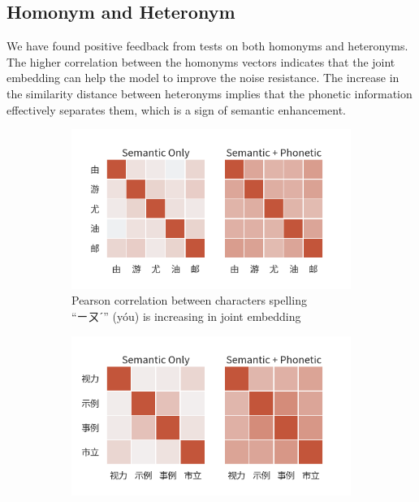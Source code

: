 \subsection{Homonym and Heteronym} \label{sec:analysis_homonym_heteronym}

We have found positive feedback from tests on both homonyms and heteronyms. The higher correlation between the homonyms vectors indicates that the joint embedding can help the model to improve the noise resistance. The increase in the similarity distance between heteronyms implies that the phonetic information effectively separates them, which is a sign of semantic enhancement.

\begin{figure}[t]
    \centering
    \begin{subfigure}[b]{0.49\textwidth}
        \centering
        \includegraphics[width=\textwidth]{../images/corr_zh1.png}
        \caption{Pearson correlation between characters spelling \\``ㄧㄡˊ'' (yóu) is increasing in joint embedding}
        \label{fig:corr_zh1}
    \end{subfigure}
    \hfill
    \begin{subfigure}[b]{0.49\textwidth}
        \centering
        \includegraphics[width=\textwidth]{../images/corr_zh2.png}

\end{subfigure}
\end{figure}
